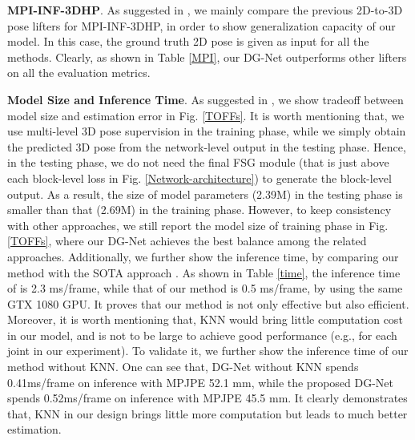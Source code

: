 \documentclass[journal]{IEEEtran}
\begin{document}
\textbf{MPI-INF-3DHP}.
As suggested in \cite{lin2019trajectory},
we mainly compare the previous 2D-to-3D pose lifters for MPI-INF-3DHP,
in order to show generalization capacity of our model.
In this case,
the ground truth 2D pose is given as input for all the methods.
Clearly, as shown in Table \ref{MPI},
our DG-Net outperforms other lifters on all the evaluation metrics.

\textbf{Model Size and Inference Time}.
As suggested in \cite{Ci_2019_ICCV,Liu_2020_CVPR},
we show tradeoff between model size and estimation error in Fig. \ref{TOFFs}.
It is worth mentioning that,
we use multi-level 3D pose supervision in the training phase,
while
we simply obtain the predicted 3D pose from the network-level output in the testing phase.
Hence,
in the testing phase,
we do not need the final FSG module (that is just above each block-level loss in Fig. \ref{Network-architecture}) to generate the block-level output.
As a result,
the size of model parameters (2.39M) in the testing phase is smaller than that (2.69M) in the training phase.
However,
to keep consistency with other approaches,
we still report the model size of training phase in Fig. \ref{TOFFs},
where
our DG-Net achieves the best balance among the related approaches.
Additionally,
we further show the inference time,
by comparing our method with the SOTA approach \cite{pavllo:videopose3d:2019}.
As shown in Table \ref{time},
the inference time of\cite{pavllo:videopose3d:2019} is 2.3 ms/frame,
while that of our method is 0.5 ms/frame,
by using the same GTX 1080 GPU.
It proves that our method is not only effective but also efficient.
Moreover,
it is worth mentioning that,
KNN would bring little computation cost in our model,
and  is not to be large to achieve good performance (e.g.,  for each joint in our experiment).
To validate it,
we further show the inference time of our method without KNN.
One can see that,
DG-Net without KNN spends 0.41ms/frame on inference with MPJPE 52.1 mm,
while
the proposed DG-Net spends 0.52ms/frame on inference with MPJPE 45.5 mm.
It clearly demonstrates that,
KNN in our design brings little more computation but leads to much better estimation.
\end{document}
